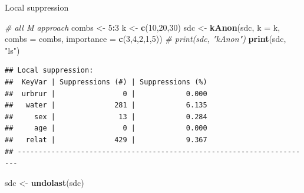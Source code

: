 \documentclass[ignorenonframetext,]{beamer}
\newenvironment{Shaded}{\begin{snugshade}}{\end{snugshade}}
\newcommand{\CommentTok}[1]{\textcolor[rgb]{0.56,0.35,0.01}{\textit{#1}}}
\newcommand{\DataTypeTok}[1]{\textcolor[rgb]{0.13,0.29,0.53}{#1}}
\newcommand{\DecValTok}[1]{\textcolor[rgb]{0.00,0.00,0.81}{#1}}
\newcommand{\KeywordTok}[1]{\textcolor[rgb]{0.13,0.29,0.53}{\textbf{#1}}}
\newcommand{\NormalTok}[1]{#1}
\newcommand{\OperatorTok}[1]{\textcolor[rgb]{0.81,0.36,0.00}{\textbf{#1}}}
\newcommand{\StringTok}[1]{\textcolor[rgb]{0.31,0.60,0.02}{#1}}
\begin{document}
\begin{frame}[fragile]{Local suppression}
\protect\hypertarget{local-suppression-1}{}

\begin{Shaded}
\begin{Highlighting}[]
\CommentTok{# all M approach}
\NormalTok{combs <-}\StringTok{ }\DecValTok{5}\OperatorTok{:}\DecValTok{3}
\NormalTok{k <-}\StringTok{ }\KeywordTok{c}\NormalTok{(}\DecValTok{10}\NormalTok{,}\DecValTok{20}\NormalTok{,}\DecValTok{30}\NormalTok{)}
\NormalTok{sdc <-}\StringTok{ }\KeywordTok{kAnon}\NormalTok{(sdc, }\DataTypeTok{k =}\NormalTok{ k, }\DataTypeTok{combs =}\NormalTok{ combs, }\DataTypeTok{importance =} \KeywordTok{c}\NormalTok{(}\DecValTok{3}\NormalTok{,}\DecValTok{4}\NormalTok{,}\DecValTok{2}\NormalTok{,}\DecValTok{1}\NormalTok{,}\DecValTok{5}\NormalTok{)) }
\CommentTok{# print(sdc, "kAnon")}
\KeywordTok{print}\NormalTok{(sdc, }\StringTok{"ls"}\NormalTok{)}
\end{Highlighting}
\end{Shaded}

\begin{verbatim}
## Local suppression:
##  KeyVar | Suppressions (#) | Suppressions (%)
##  urbrur |                0 |            0.000
##   water |              281 |            6.135
##     sex |               13 |            0.284
##     age |                0 |            0.000
##   relat |              429 |            9.367
## ----------------------------------------------------------------------
\end{verbatim}

\begin{Shaded}
\begin{Highlighting}[]
\NormalTok{sdc <-}\StringTok{ }\KeywordTok{undolast}\NormalTok{(sdc)}
\end{Highlighting}
\end{Shaded}

\end{frame}
\end{document}
